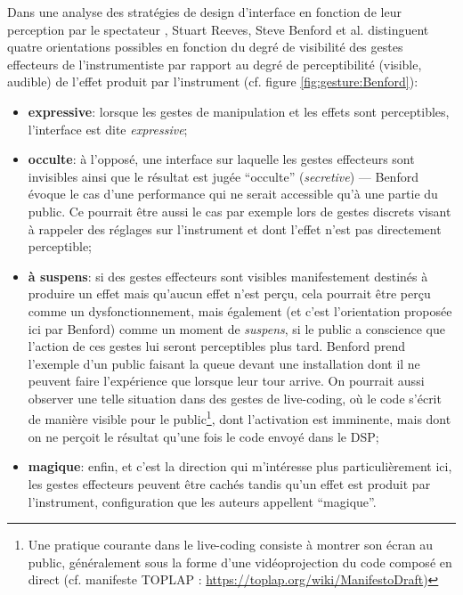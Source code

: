 \noindent Dans une analyse des stratégies de design d'interface en fonction de leur perception par le spectateur \cite{reeves_designing_2005}, Stuart Reeves, Steve Benford et al. distinguent quatre orientations possibles en fonction du degré de visibilité des gestes effecteurs de l'instrumentiste par rapport au degré de perceptibilité (visible, audible) de l'effet produit par l'instrument (cf. figure \ref{fig:gesture:Benford}):
\vspace{-1em}
\begin{itemize}[noitemsep]
 	\item \textbf{expressive}: lorsque les gestes de manipulation et les effets sont perceptibles, l'interface est dite \textit{expressive}; 
 	\item \textbf{occulte}: à l'opposé, une interface sur laquelle les gestes effecteurs sont invisibles ainsi que le résultat est jugée ``occulte'' (\textit{secretive}) — Benford évoque le cas d'une performance qui ne serait accessible qu'à une partie du public. Ce pourrait être aussi le cas par exemple lors de gestes discrets visant à rappeler des réglages sur l'instrument et dont l'effet n'est pas directement perceptible; 
 	\item \textbf{à suspens}: si des gestes effecteurs sont visibles manifestement destinés à produire un effet mais qu'aucun effet n'est perçu, cela pourrait être perçu comme un dysfonctionnement, mais également (et c'est l'orientation proposée ici par Benford) comme un moment de \textit{suspens}, si le public a conscience que l'action de ces gestes lui seront perceptibles plus tard. Benford prend l'exemple d'un public faisant la queue devant une installation dont il ne peuvent faire l'expérience que lorsque leur tour arrive. On pourrait aussi observer une telle situation dans des gestes de live-coding, où le code s'écrit de manière visible pour le public\footnote{Une pratique courante dans le live-coding consiste à montrer son écran au public, généralement sous la forme d'une vidéoprojection du code composé en direct (cf. manifeste TOPLAP : \url{https://toplap.org/wiki/ManifestoDraft})}, dont l'activation est imminente, mais dont on ne perçoit le résultat qu'une fois le code envoyé dans le \gls{DSP};
 	\item \textbf{magique}: enfin, et c'est la direction qui m'intéresse plus particulièrement ici, les gestes effecteurs peuvent être cachés tandis qu'un effet est produit par l'instrument, configuration que les auteurs appellent ``magique''.
\end{itemize}

